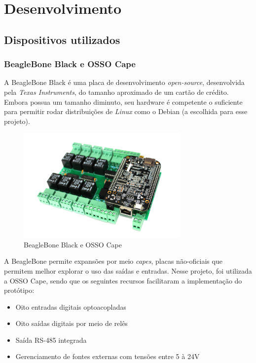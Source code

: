 \chapter{Desenvolvimento}

\section{Dispositivos utilizados}

\subsection{BeagleBone Black e OSSO Cape}

A BeagleBone Black é uma placa de desenvolvimento \textit{open-source}, desenvolvida pela \textit{Texas Instruments}, do tamanho aproximado de um cartão de crédito. Embora possua um tamanho diminuto, seu hardware é competente o suficiente para permitir rodar distribuições de \textit{Linux} como o Debian (a escolhida para esse projeto).

\begin{figure}[H]
        \begin{center}
                \includegraphics[width=0.75\textwidth,natwidth=585,natheight=180]{assets/images/devices-beaglebone.jpg}
                \caption{BeagleBone Black e OSSO Cape}
                \label{fig:bbb}
        \end{center}
\end{figure}

A BeagleBone permite expansões por meio \textit{capes}, placas não-oficiais que permitem melhor explorar o uso das saídas e entradas. Nesse projeto, foi utilizada a OSSO Cape, sendo que os seguintes recursos facilitaram a implementação do protótipo:

\begin{itemize}
  \item Oito entradas digitais optoacopladas
  \item Oito saídas digitais por meio de relês
  \item Saída RS-485 integrada
  \item Gerenciamento de fontes externas com tensões entre 5 à 24V
\end{itemize}

